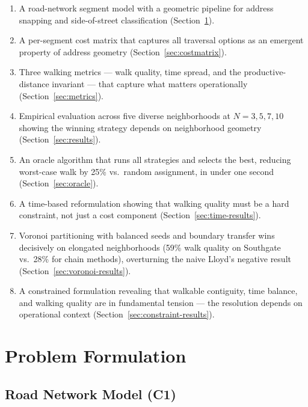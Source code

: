 \documentclass[conference]{IEEEtran}
\begin{document}
\begin{enumerate}
\item[\textbf{C1.}] A road-network segment model with a geometric pipeline for address snapping and side-of-street classification (Section~\ref{sec:formulation}).
\item[\textbf{C2.}] A per-segment cost matrix that captures all traversal options as an emergent property of address geometry (Section~\ref{sec:costmatrix}).
\item[\textbf{C3.}] Three walking metrics --- walk quality, time spread, and the productive-distance invariant --- that capture what matters operationally (Section~\ref{sec:metrics}).
\item[\textbf{C4.}] Empirical evaluation across five diverse neighborhoods at $N = 3, 5, 7, 10$ showing the winning strategy depends on neighborhood geometry (Section~\ref{sec:results}).
\item[\textbf{C5.}] An oracle algorithm that runs all strategies and selects the best, reducing worst-case walk by 25\% vs.\ random assignment, in under one second (Section~\ref{sec:oracle}).
\item[\textbf{C6.}] A time-based reformulation showing that walking quality must be a hard constraint, not just a cost component (Section~\ref{sec:time-results}).
\item[\textbf{C7.}] Voronoi partitioning with balanced seeds and boundary transfer wins decisively on elongated neighborhoods (59\% walk quality on Southgate vs.\ 28\% for chain methods), overturning the naive Lloyd's negative result (Section~\ref{sec:voronoi-results}).
\item[\textbf{C8.}] A constrained formulation revealing that walkable contiguity, time balance, and walking quality are in fundamental tension --- the resolution depends on operational context (Section~\ref{sec:constraint-results}).
\end{enumerate}

\section{Problem Formulation}
\label{sec:formulation}

\subsection{Road Network Model (C1)}
\end{document}
